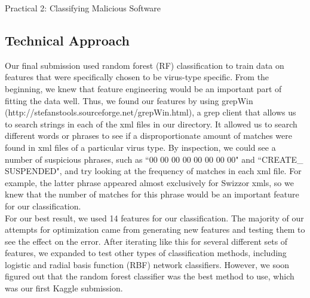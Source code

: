 \documentclass[submit]{harvardml}
\begin{document}
\begin{center}
{\Large Practical 2: Classifying Malicious Software}\\
\end{center}
\vspace{4mm}
\subsection*{Technical Approach}

Our final submission used random forest (RF) classification to train data on features that were specifically chosen to be virus-type specific. From the beginning, we knew that feature engineering would be an important part of fitting the data well. Thus, we found our features by using grepWin (http://stefanstools.sourceforge.net/grepWin.html), a grep client that allows us to search strings in each of the xml files in our directory. It allowed us to search different words or phrases to see if a disproportionate amount of matches were found in xml files of a particular virus type. By inspection, we could see a number of suspicious phrases, such as ``00 00 00 00 00 00 00 00" and ``CREATE\_ SUSPENDED", and try looking at the frequency of matches in each xml file. For example, the latter phrase appeared almost exclusively for Swizzor xmls, so we knew that the number of matches for this phrase would be an important feature for our classification.\\

	For our best result, we used 14 features for our classification. The majority of our attempts for optimization came from generating new features and testing them to see the effect on the error. After iterating like this for several different sets of features, we expanded to test other types of classification methods, including logistic and radial basis function (RBF) network classifiers. However, we soon figured out that the random forest classifier was the best method to use, which was our first Kaggle submission.\\
\end{document}
